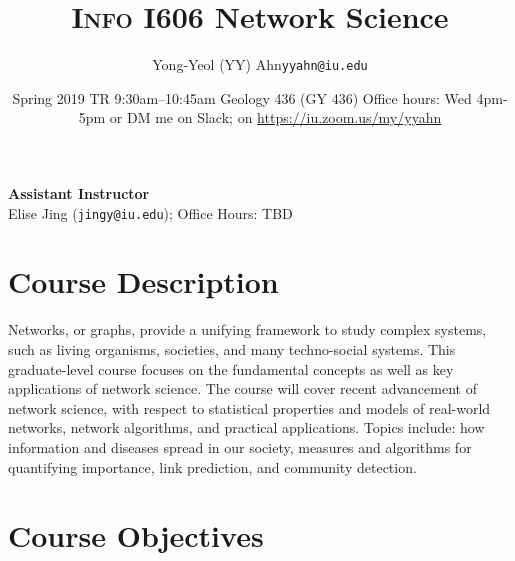 \documentclass[11pt,article,oneside]{memoir} %
\makeatletter
\def\myauthor{Author}
\def\mytitle{Title}
\def\myemail{yyahn@iu.edu}
\def\myauthor{Yong-Yeol (YY) Ahn}
\def\mytitle{{\normalsize \textsc{Info} I606 \newline} \HUGE Network Science}
\makeatother
\begin{document}


\def\ind{\hangindent=1 true cm\hangafter=1 \noindent}
\def\labelitemi{$\cdot$}


\title{\LARGE \mytitle}
\author{\Large\myauthor \newline \footnotesize\texttt{\noindent\myemail}}
\date{Spring 2019 %
\newline TR 9:30am--10:45am
\newline Geology 436 (GY 436)
\newline Office hours: Wed 4pm-5pm or DM me on Slack; on \url{https://iu.zoom.us/my/yyahn}}

\maketitle
\vspace{-20pt}
{\bfseries Assistant Instructor} \\ Elise Jing (\texttt{jingy@iu.edu}); Office Hours: TBD

\section{Course Description} %

Networks, or graphs, provide a unifying framework to study complex systems, such as living organisms, societies, and many techno-social systems.
This graduate-level course focuses on the fundamental concepts as well as key applications of network science.
The course will cover recent advancement of network science, with respect to statistical properties and models of real-world networks, network algorithms, and practical applications.
Topics include: how information and diseases spread in our society, measures and algorithms for quantifying importance, link prediction, and community detection.


\section{Course Objectives} %
\end{document}
